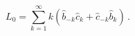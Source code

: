 \begin{equation}
L_{0}=\sum_{k=1}^{\infty }k(\hat{b}_{-k}\hat{c}_{k}+\hat{c}_{-k}\hat{b}
_{k})\,.
\end{equation}

